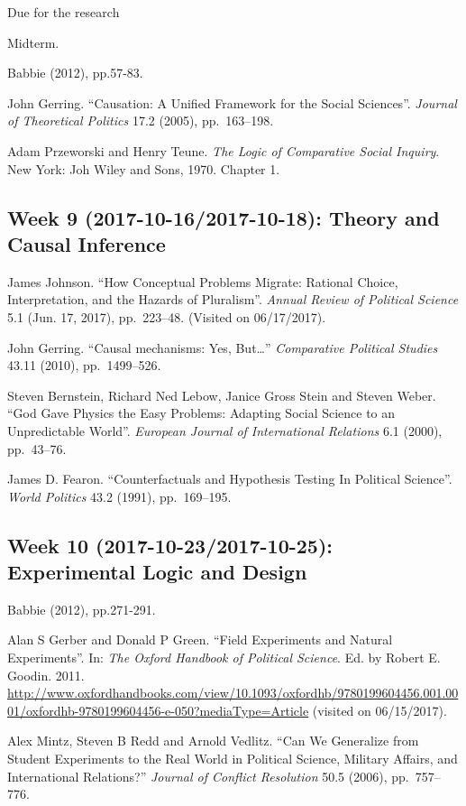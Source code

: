 \documentclass[11pt,]{article}
\theoremstyle{definition}
\theoremstyle{definition}
\theoremstyle{remark}
\begin{document}
Due for the research

Midterm.

Babbie (2012), pp.57-83.

John Gerring. ``Causation: A Unified Framework for the Social
Sciences''. \emph{Journal of Theoretical Politics} 17.2 (2005),
pp.~163--198.

Adam Przeworski and Henry Teune.
\emph{The Logic of Comparative Social Inquiry}. New York: Joh Wiley and
Sons, 1970. Chapter 1.

\subsection{Week 9 (2017-10-16/2017-10-18): Theory and Causal
Inference}\label{week-9-2017-10-162017-10-18-theory-and-causal-inference}

James Johnson. ``How Conceptual Problems Migrate: Rational Choice,
Interpretation, and the Hazards of Pluralism''.
\emph{Annual Review of Political Science} 5.1 (Jun. 17, 2017),
pp.~223--48. (Visited on 06/17/2017).

John Gerring. ``Causal mechanisms: Yes, But\ldots{}''
\emph{Comparative Political Studies} 43.11 (2010), pp.~1499--526.

Steven Bernstein, Richard Ned Lebow, Janice Gross Stein and Steven
Weber. ``God Gave Physics the Easy Problems: Adapting Social Science to
an Unpredictable World''.
\emph{European Journal of International Relations} 6.1 (2000),
pp.~43--76.

James D. Fearon. ``Counterfactuals and Hypothesis Testing In Political
Science''. \emph{World Politics} 43.2 (1991), pp.~169--195.

\subsection{Week 10 (2017-10-23/2017-10-25): Experimental Logic and
Design}\label{week-10-2017-10-232017-10-25-experimental-logic-and-design}

Babbie (2012), pp.271-291.

Alan S Gerber and Donald P Green. ``Field Experiments and Natural
Experiments''. In: \emph{The Oxford Handbook of Political Science}. Ed.
by Robert E. Goodin. 2011.
\url{http://www.oxfordhandbooks.com/view/10.1093/oxfordhb/9780199604456.001.0001/oxfordhb-9780199604456-e-050?mediaType=Article}
(visited on 06/15/2017).

Alex Mintz, Steven B Redd and Arnold Vedlitz. ``Can We Generalize from
Student Experiments to the Real World in Political Science, Military
Affairs, and International Relations?''
\emph{Journal of Conflict Resolution} 50.5 (2006), pp.~757--776.
\end{document}
